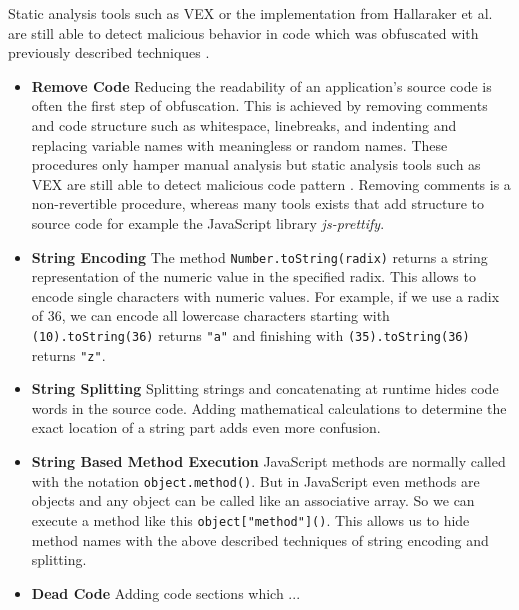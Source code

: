 			Static analysis tools such as VEX or the implementation from Hallaraker et al. are still able to detect malicious behavior in code which was obfuscated with previously described techniques \cite{Bandhakavi:2011:VBE:1995376.1995398, Hallaraker:2005:DMJ:1078029.1078861}. 
			
			\begin{itemize}
				\item \textbf{Remove Code } Reducing the readability of an application's source code is often the first step of obfuscation. This is achieved by removing comments and code structure such as whitespace, linebreaks, and indenting and replacing variable names with meaningless or random names. These procedures only hamper manual analysis but static analysis tools such as VEX are still able to detect malicious code pattern \cite{Bandhakavi:2011:VBE:1995376.1995398}. Removing comments is a non-revertible procedure, whereas many tools exists that add structure to source code for example the JavaScript library \textit{js-prettify}. 
				\item \textbf{String Encoding} The method \texttt{Number.toString(radix)} returns a string representation of the numeric value in the specified radix. This allows to encode single characters with numeric values. For example, if we use a radix of 36, we can encode all lowercase characters starting with \texttt{(10).toString(36)} returns \texttt{"a"} and finishing with \texttt{(35).toString(36)} returns \texttt{"z"}.
				\item \textbf{String Splitting} Splitting strings and concatenating at runtime hides code words in the source code. Adding mathematical calculations to determine the exact location of a string part adds even more confusion.
				\item \textbf{String Based Method Execution} JavaScript methods are normally called with the notation \texttt{object.method()}. But in JavaScript even methods are objects and any object can be called like an associative array. So we can execute a method like this \texttt{object["method"]()}. This allows us to hide method names with the above described techniques of string encoding and splitting. %
				\item \textbf{Dead Code} Adding code sections which ...
			\end{itemize}
			
